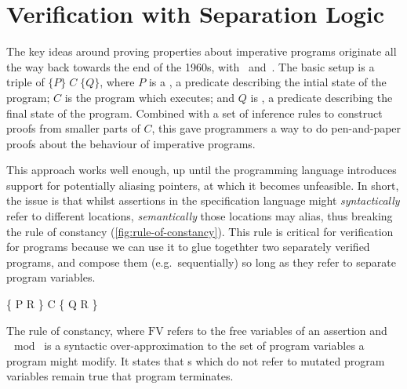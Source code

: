 \section{Verification with Separation Logic}\label{sec:sep-logic-intro}

The key ideas around proving properties about imperative programs originate all
the way back towards the end of the 1960s, with~\citeauthor{floyd1993assigning}
and~\citeauthor{hoare1969axiomatic}. The basic setup is a triple of
$\{P\} \;C \; \{Q\}$, where $P$ is a , a predicate describing the
intial state of the program; $C$ is the program which executes; and $Q$ is
, a predicate describing the final state of the program.
Combined with a set of inference rules to construct proofs from smaller parts
of $C$, this gave programmers a way to do pen-and-paper proofs about the
behaviour of imperative programs.

This approach works well enough, up until the programming language introduces
support for potentially aliasing pointers, at which it becomes
unfeasible. In short, the issue is that
whilst assertions in the specification language might \emph{syntactically}
refer to different locations, \emph{semantically} those locations may alias,
thus breaking the rule of constancy (\cref{fig:rule-of-constancy}). This rule
is critical for  verification for programs because we can use it
to glue togethter two separately verified programs, and compose them (e.g.\
sequentially) so long as they refer to separate program variables.

\begin{marginfigure}
  \begin{mathpar}
                {\vdash{} \{ P \wedge{} R \} \; C \; \{ Q \wedge{} R \}}
  \end{mathpar}
  \caption{The rule of constancy, where $\mathrm{FV}$ refers to the free
      variables of an assertion and $\mod{}$ is a syntactic
      over-approximation to the set of program variables a program might
      modify. It states that \kl{precondition}s which do not refer to mutated
      program variables remain true that program terminates.}\label{fig:rule-of-constancy}
\end{marginfigure}

